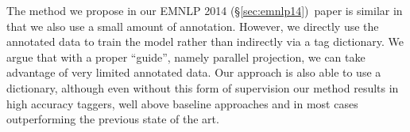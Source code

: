 \documentclass[12pt,twoside,final,hidelinks]{ltthesis}
\theoremstyle{definition}
\newcommand\emnlpiv{EMNLP 2014 (\S\ref{sec:emnlp14})}
\begin{document}
The method we propose in our \emnlpiv\ paper is similar in that we also use a small amount of annotation. However, we directly use the annotated data to train the model rather than indirectly via a tag dictionary. We argue that with a proper ``guide'', namely parallel projection, we can take advantage of very limited annotated data. Our approach is also able to use a dictionary, although even without this form of supervision our method results in high accuracy taggers, well above baseline approaches and in most cases outperforming the previous state of the art.  
 

\end{document}
